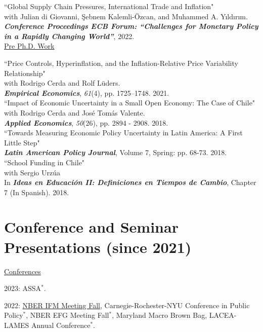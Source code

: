 \documentclass[11pt]{article}
\begin{document}
``Global Supply Chain Pressures, International Trade and Inflation"\\
with Julian di Giovanni, \c{S}ebnem Kalemli-\"{O}zcan, and Muhammed A. Y{\i}ld{\i}r{\i}m. \\
\textbf{\textit{Conference Proceedings ECB Forum: ``Challenges for Monetary Policy in a Rapidly Changing World''}}, 2022.\\[-0.1in]

\underline{Pre Ph.D. Work} 

``Price Controls, Hyperinflation, and the Inflation-Relative Price Variability Relationship"\\
 with Rodrigo Cerda and Rolf L\"{u}ders. \\
 \textbf{\textit{Empirical Economics}}, \emph{61}(4), pp. 1725--1748. 2021.\\[-0.1in]

``Impact of Economic Uncertainty in a Small Open Economy: The Case of Chile"\\
 with Rodrigo Cerda and Jos\'e Tom\'as Valente. \\
 \textbf{\textit{Applied Economics}}, \textit{50}(26), pp. 2894 - 2908. 2018.\\[-0.1in]



``Towards Measuring Economic Policy Uncertainty in Latin America: A First Little Step" \\
\textbf{\textit{Latin American Policy Journal}}, Volume 7, Spring: pp. 68-73. 2018.\\[-0.1in]

``School Funding in Chile"\\
 with Sergio Urz\'ua \\
In  \textbf{\textit{Ideas en Educaci\'on II: Definiciones en Tiempos de Cambio}}, Chapter 7 (In Spanish). 2018.

\section*{Conference and Seminar Presentations (since 2021)}

\underline{Conferences}

2023: ASSA$^\ast$.

2022: \underline{NBER IFM Meeting Fall}, Carnegie-Rochester-NYU Conference in Public Policy$^\ast$, NBER EFG Meeting Fall$^\ast$, Maryland Macro Brown Bag, LACEA-LAMES Annual Conference$^\ast$.
\end{document}
